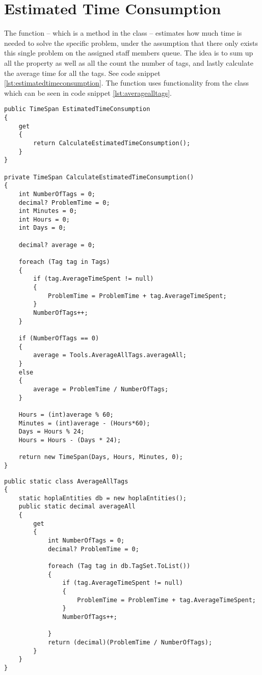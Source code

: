 \section{Estimated Time Consumption}
\label{sec:estimated_time_consumption}

The  function -- which is a method in the  class -- estimates how much time is needed to solve the specific problem, under the assumption that there only exists this single problem on the assigned staff members queue. The idea is to sum up all the  property as well as all the count the number of tags, and lastly calculate the average time for all the tags. See code snippet \ref{lst:estimatedtimeconsumption}. The  function uses functionality from the  class which can be seen in code snippet \ref{lst:averagealltags}.

\begin{lstlisting}[style=sourceCode, caption=\myCaption{The ManageTagTimes method. In lines one to seven a property is shown, which wraps the method in lines nine to forty-three.}, label=lst:estimatedtimeconsumption]
public TimeSpan EstimatedTimeConsumption
{
    get
    {
        return CalculateEstimatedTimeConsumption();
    }
}

private TimeSpan CalculateEstimatedTimeConsumption()
{
    int NumberOfTags = 0;
    decimal? ProblemTime = 0;
    int Minutes = 0;
    int Hours = 0;
    int Days = 0;

    decimal? average = 0;

    foreach (Tag tag in Tags)
    {
        if (tag.AverageTimeSpent != null)
        {
            ProblemTime = ProblemTime + tag.AverageTimeSpent;
        }
        NumberOfTags++;
    }

    if (NumberOfTags == 0)
    {
        average = Tools.AverageAllTags.averageAll;
    }
    else
    {
        average = ProblemTime / NumberOfTags;
    }

    Hours = (int)average % 60;
    Minutes = (int)average - (Hours*60);
    Days = Hours % 24;
    Hours = Hours - (Days * 24);

    return new TimeSpan(Days, Hours, Minutes, 0);
}
\end{lstlisting}

\begin{lstlisting}[style=sourceCode, caption=\myCaption{The \cl{AverageAllTags} class, which is stored in the Tools folder.}, label=lst:averagealltags]
public static class AverageAllTags
{
    static hoplaEntities db = new hoplaEntities();
    public static decimal averageAll
    {
        get
        {
            int NumberOfTags = 0;
            decimal? ProblemTime = 0;

            foreach (Tag tag in db.TagSet.ToList())
            {
                if (tag.AverageTimeSpent != null)
                {
                    ProblemTime = ProblemTime + tag.AverageTimeSpent;
                }
                NumberOfTags++;
                
            }
            return (decimal)(ProblemTime / NumberOfTags);
        }
    }
}
\end{lstlisting}